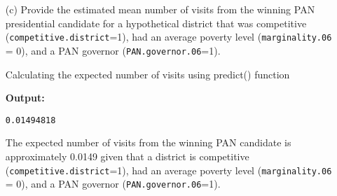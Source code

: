 \documentclass[12pt,letterpaper]{article}
\begin{document}
\begin{enumerate}
	\item [(c)]
	Provide the estimated mean number of visits from the winning PAN presidential candidate for a hypothetical district that was competitive (\texttt{competitive.district}=1), had an average poverty level (\texttt{marginality.06} = 0), and a PAN governor (\texttt{PAN.governor.06}=1).
			
			\vspace{0.5cm}	
		\noindent  Calculating the expected number of visits using predict() function
	 
	\noindent \textbf{Output:}
	
	
		\begin{lstlisting}
0.01494818 
	\end{lstlisting}
	
	\noindent The expected number of visits from the winning PAN candidate is approximately 0.0149 given that a district is competitive (\texttt{competitive.district}=1), had an average poverty level (\texttt{marginality.06} = 0), and a PAN governor (\texttt{PAN.governor.06}=1).
	
\end{enumerate}
\end{document}
